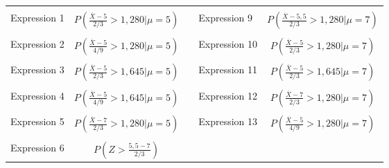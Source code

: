 \begin{questions}
\begin{tabular}{|l|c|c|l|c|}
	\cline{1-2}\cline{4-5}
	&&&&\\[-3mm]
	Expression 1 &  $\displaystyle P\left( \frac{\overline{X}-5}{ 2 / 3} > 1,280 \bigg| \mu = 5 \right)$
	 & \hspace{0.3cm} &
	Expression 9 &  $\displaystyle P\left( \frac{\overline{X}-5,5}{ 2 / 3} > 1,280 \bigg| \mu = 7 \right)$
	\\[4mm]
	\cline{1-2}\cline{4-5}
	&&&&\\[-3mm]
	Expression 2 & $\displaystyle P\left( \frac{\overline{X} - 5}{4/9} > 1,280 \bigg| \mu = 5  \right)$
	&  &
	Expression 10 & $\displaystyle P\left( \frac{\overline{X}-5}{ 2 / 3} > 1,280 \bigg| \mu = 7 \right)$ 
	\\[4mm]
	\cline{1-2}\cline{4-5}
	&&&&\\[-3mm]
	Expression 3 & $\displaystyle P\left( \frac{\overline{X}-5}{ 2 / 3} > 1,645 \bigg| \mu = 5 \right)$
	 &  &
	 Expression 11 & $\displaystyle P\left( \frac{\overline{X}-5}{ 2 / 3} > 1,645 \bigg| \mu = 7 \right)$
	 \\[4mm]
	 \cline{1-2}\cline{4-5}
	 &&&&\\[-3mm]
	  Expression 4 & $\displaystyle P\left( \frac{\overline{X} - 5}{4/9} > 1,645 \bigg| \mu = 5  \right)$
	 &  &
	 Expression 12 & $\displaystyle P\left( \frac{\overline{X} - 7}{2/3} > 1,280 \bigg| \mu = 7 \right)$
	 \\[4mm]
	 \cline{1-2}\cline{4-5}
	 &&&&\\[-3mm]
	 Expression 5 & $\displaystyle P\left( \frac{\overline{X} - 7}{2/3} > 1,280 \bigg| \mu = 5  \right)$
	 &  &
	 Expression 13 & $\displaystyle P\left( \frac{\overline{X}-5}{ 4 / 9} > 1,280 \bigg| \mu = 7 \right)$
	 \\[4mm]
	 \cline{1-2}\cline{4-5}
	 &&&&\\[-3mm]
	 Expression 6 & $\displaystyle P\left( Z > \frac{5,5-7}{2/3} \right)$

\end{tabular}
\end{questions}
